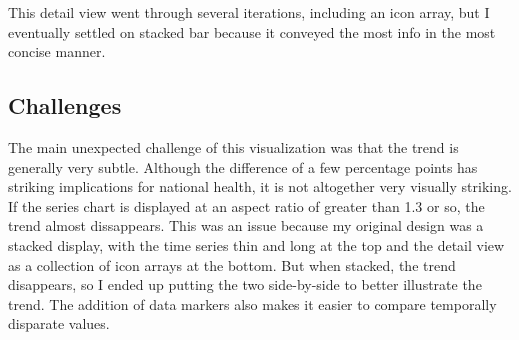 \documentclass{article}
\begin{document}
This detail view went through several iterations, including an icon array, but I eventually settled on stacked bar because it conveyed the most info in the most concise manner.


\subsection{Challenges}

The main unexpected challenge of this visualization was that the trend is generally very subtle.  Although the difference of a few percentage points has striking implications for national health,  it is not altogether very visually striking.  If the series chart is displayed at an aspect ratio of greater than 1.3 or so, the trend almost dissappears. This was an issue because my original design was a stacked display, with the time series thin and long at the top and the detail view as a collection of icon arrays at the bottom.  But when stacked, the trend disappears, so I ended up putting the two side-by-side to better illustrate the trend.  The addition of data markers also makes it easier to compare temporally disparate values.
\end{document}
